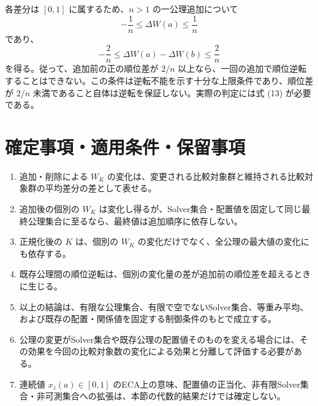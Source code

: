 各差分は $[0,1]$ に属するため、$n>1$ の一公理追加について
\[
-\frac1n\le\Delta W(a)\le\frac1n
\]
であり、
\[
-\frac2n\le\Delta W(a)-\Delta W(b)\le\frac2n
\]
を得る。従って、追加前の正の順位差が $2/n$ 以上なら、一回の追加で順位逆転することはできない。この条件は逆転不能を示す十分な上限条件であり、順位差が $2/n$ 未満であること自体は逆転を保証しない。実際の判定には式 (13) が必要である。

\section{確定事項・適用条件・保留事項}
\begin{enumerate}
\item 追加・削除による $W_K$ の変化は、変更される比較対象群と維持される比較対象群の平均差分の差として表せる。
\item 追加後の個別の $W_K$ は変化し得るが、Solver集合・配置値を固定して同じ最終公理集合に至るなら、最終値は追加順序に依存しない。
\item 正規化後の $K$ は、個別の $W_K$ の変化だけでなく、全公理の最大値の変化にも依存する。
\item 既存公理間の順位逆転は、個別の変化量の差が追加前の順位差を超えるときに生じる。
\item 以上の結論は、有限な公理集合、有限で空でないSolver集合、等重み平均、および既存の配置・関係値を固定する制御条件のもとで成立する。
\item 公理の変更がSolver集合や既存公理の配置値そのものを変える場合には、その効果を今回の比較対象数の変化による効果と分離して評価する必要がある。
\item 連続値 $x_z(a)\in[0,1]$ のECA上の意味、配置値の正当化、非有限Solver集合・非可測集合への拡張は、本節の代数的結果だけでは確定しない。
\end{enumerate}
